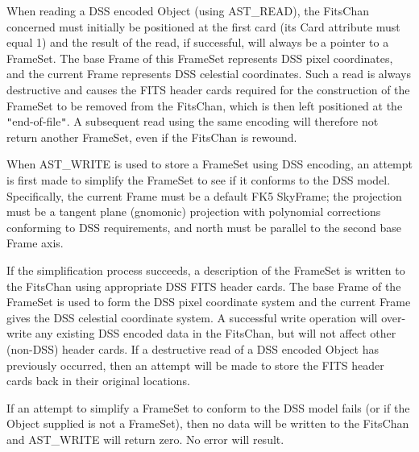 \documentclass[twoside,11pt]{article}
\newcommand{\htmlref}[2]{#1}
\begin{document}
{{      When reading a DSS encoded Object (using AST\_READ), the FitsChan
      concerned must initially be positioned at the first card (its
      \htmlref{Card}{Card} attribute must equal 1) and the result of the read, if
      successful, will always be a pointer to a FrameSet. The base
      \htmlref{Frame}{Frame} of this FrameSet represents DSS pixel coordinates, and the
      current Frame represents DSS celestial coordinates. Such a read
      is always destructive and causes the FITS header cards required
      for the construction of the FrameSet to be removed from the
      FitsChan, which is then left positioned at the {\tt{"}}end-of-file{\tt{"}}. A
      subsequent read using the same encoding will therefore not
      return another FrameSet, even if the FitsChan is rewound.

      When AST\_WRITE is used to store a FrameSet using DSS encoding,
      an attempt is first made to simplify the FrameSet to see if it
      conforms to the DSS model.  Specifically, the current Frame must
      be a default FK5 \htmlref{SkyFrame}{SkyFrame}; the projection must be a tangent plane
      (gnomonic) projection with polynomial corrections conforming to
      DSS requirements, and north must be parallel to the second base
      Frame axis.

      If the simplification process succeeds, a description of the
      FrameSet is written to the FitsChan using appropriate DSS FITS
      header cards. The base Frame of the FrameSet is used to form the
      DSS pixel coordinate system and the current Frame gives the DSS
      celestial coordinate system.  A successful write operation will
      over-write any existing DSS encoded data in the FitsChan, but
      will not affect other (non-DSS) header cards. If a destructive
      read of a DSS encoded Object has previously occurred, then an
      attempt will be made to store the FITS header cards back in
      their original locations.

      If an attempt to simplify a FrameSet to conform to the DSS model
      fails (or if the Object supplied is not a FrameSet), then no
      data will be written to the FitsChan and AST\_WRITE will return
      zero. No error will result.
   }
   }
\end{document}
